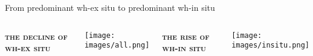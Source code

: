 \documentclass[lesson_slides]{subfiles}
\begin{document}
\begin{frame}[c]{From predominant wh-ex situ to predominant wh-in situ}

\begin{columns}
        \centering
        \textbf{\textsc{the decline of wh-ex situ}}
    \begin{center}
        \texttt{[image: images/all.png]}
    \end{center}
        \centering
        \textbf{\textsc{the rise of wh-in situ}}
        \begin{center}
        \texttt{[image: images/insitu.png]}
    \end{center}
    \end{columns}
  
\end{frame}
\end{document}
